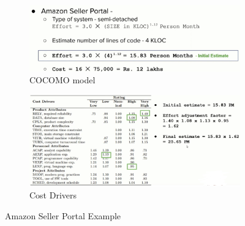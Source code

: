 \documentclass[a4paper]{article}
\begin{document}
\begin{itemize}
    \begin{figure}[H]
        \centering
        \begin{subfigure}[b]{0.40\textwidth}
            \centering
            \includegraphics[width=\textwidth]{Degree/static/SE_COCOMO_ex.png}
            \caption{COCOMO model}
        \end{subfigure}
        \hfill
        \begin{subfigure}[b]{0.50\textwidth}
            \centering
            \includegraphics[width=\textwidth]{Degree/static/SE_cost_driver.png}
            \caption{Cost Drivers}
        \end{subfigure}
        \caption{Amazon Seller Portal Example}
        \label{fig:SE-amazon-seller}
    \end{figure}
\end{itemize}
\end{document}
